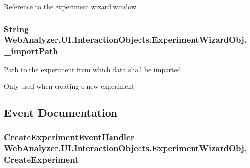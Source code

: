 Reference to the experiment wizard window 

\hypertarget{class_web_analyzer_1_1_u_i_1_1_interaction_objects_1_1_experiment_wizard_obj_ac39fd1cef0cdfe82f059db09b97cc0f2}{}
\subsubsection[{\+\_\+import\+Path}]{\setlength{\rightskip}{0pt plus 5cm}String Web\+Analyzer.\+U\+I.\+Interaction\+Objects.\+Experiment\+Wizard\+Obj.\+\_\+import\+Path\hspace{0.3cm}{\ttfamily [private]}}\label{class_web_analyzer_1_1_u_i_1_1_interaction_objects_1_1_experiment_wizard_obj_ac39fd1cef0cdfe82f059db09b97cc0f2}


Path to the experiment from which data shall be imported 

Only used when creating a new experiment

\subsection{Event Documentation}
\hypertarget{class_web_analyzer_1_1_u_i_1_1_interaction_objects_1_1_experiment_wizard_obj_a95676a614efb19092a4522290e47ef96}{}
\subsubsection[{Create\+Experiment}]{\setlength{\rightskip}{0pt plus 5cm}Create\+Experiment\+Event\+Handler Web\+Analyzer.\+U\+I.\+Interaction\+Objects.\+Experiment\+Wizard\+Obj.\+Create\+Experiment}\label{class_web_analyzer_1_1_u_i_1_1_interaction_objects_1_1_experiment_wizard_obj_a95676a614efb19092a4522290e47ef96}


